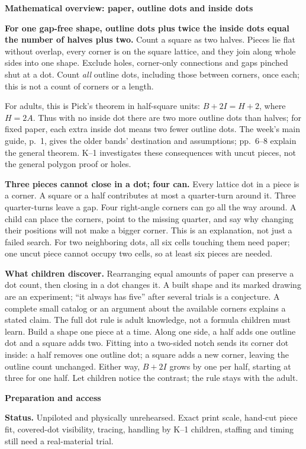 \documentclass[11pt]{article}
\newcommand{\head}[1]{\par\textbf{\large #1}\par}
\begin{document}
\head{Mathematical overview: paper, outline dots and inside dots}
\textbf{For one gap-free shape, outline dots plus twice the inside dots equal the number of halves plus two.} Count a square as two halves. Pieces lie flat without overlap, every corner is on the square lattice, and they join along whole sides into one shape. Exclude holes, corner-only connections and gaps pinched shut at a dot. Count \emph{all} outline dots, including those between corners, once each; this is not a count of corners or a length.

For adults, this is Pick's theorem in half-square units: $B+2I=H+2$, where $H=2A$. Thus with no inside dot there are two more outline dots than halves; for fixed paper, each extra inside dot means two fewer outline dots. The week's main guide, p.~1, gives the older bands' destination and assumptions; pp.~6--8 explain the general theorem. K--1 investigates these consequences with uncut pieces, not the general polygon proof or holes.

\textbf{Three pieces cannot close in a dot; four can.} Every lattice dot in a piece is a corner. A square or a half contributes at most a quarter-turn around it. Three quarter-turns leave a gap. Four right-angle corners can go all the way around. A child can place the corners, point to the missing quarter, and say why changing their positions will not make a bigger corner. This is an explanation, not just a failed search. For two neighboring dots, all six cells touching them need paper; one uncut piece cannot occupy two cells, so at least six pieces are needed.

\textbf{What children discover.} Rearranging equal amounts of paper can preserve a dot count, then closing in a dot changes it. A built shape and its marked drawing are an experiment; ``it always has five'' after several trials is a conjecture. A complete small catalog or an argument about the available corners explains a stated claim. The full dot rule is adult knowledge, not a formula children must learn. Build a shape one piece at a time. Along one side, a half adds one outline dot and a square adds two. Fitting into a two-sided notch sends its corner dot inside: a half removes one outline dot; a square adds a new corner, leaving the outline count unchanged. Either way, $B+2I$ grows by one per half, starting at three for one half. Let children notice the contrast; the rule stays with the adult.

\head{Preparation and access}
\textbf{Status.} Unpiloted and physically unrehearsed. Exact print scale, hand-cut piece fit, covered-dot visibility, tracing, handling by K--1 children, staffing and timing still need a real-material trial.
\end{document}
